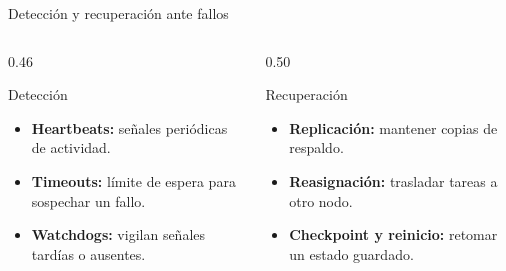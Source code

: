 \renewcommand{\fuentespie}{Fuentes: \cite{mushtaq2024,asch2025,chaurasia2024}}
\begin{frame}{Detección y recuperación ante fallos}
  \begin{columns}[T,onlytextwidth]
    \begin{column}{0.46\textwidth}
      \begin{block}{Detección}
        \small
        \begin{itemize}
          \item \textbf{Heartbeats:} señales periódicas de actividad.
          \item \textbf{Timeouts:} límite de espera para sospechar un fallo.~\cite{chaurasia2024}
          \item \textbf{Watchdogs:} vigilan señales tardías o ausentes.~\cite{asch2025}
        \end{itemize}
      \end{block}
    \end{column}

    \begin{column}{0.50\textwidth}
      \begin{block}{Recuperación}
        \small
        \begin{itemize}
          \item \textbf{Replicación:} mantener copias de respaldo.
          \item \textbf{Reasignación:} trasladar tareas a otro nodo.
          \item \textbf{Checkpoint y reinicio:} retomar un estado guardado.~\cite{mushtaq2024}
        \end{itemize}
      \end{block}
    \end{column}
  \end{columns}
\end{frame}
\renewcommand{\fuentespie}{Fuentes: [PENDIENTE]}

